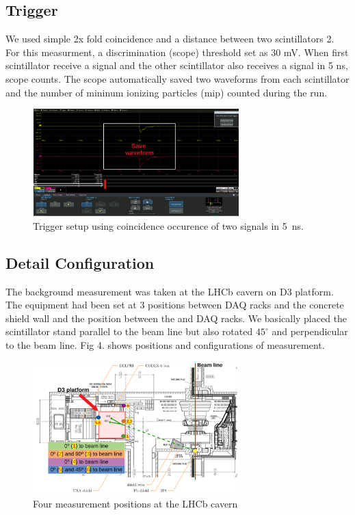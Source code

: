 \subsection{Trigger}
We used simple 2x fold coincidence and a distance between two scintillators 2\cm. 
For this measurment, a discrimination (scope) threshold set as 30 mV.
When first scintillator receive a signal and the other scintillator also receives a signal in 5 ns, scope counts.
The scope automatically saved two waveforms from each scintillator and the number of mininum ionizing particles (mip) counted during the run.

\begin{figure}[h]
\centering
    \includegraphics[width=8cm]{figs/INT/waveform.pdf}
\caption{
    Trigger setup using coincidence occurence of two signals in 5~ns. 
}
\end{figure}

\subsection{Detail Configuration}

The background measurement was taken at the LHCb cavern on D3 platform. The equipment had been set at 3 positions between DAQ racks and the concrete shield wall and the position between the \delphi and DAQ racks.
We basically placed the scintillator stand parallel to the beam line but also rotated $45^{\circ}$ and perpendicular to the beam line.
Fig 4. shows positions and configurations of measurement.

\begin{figure}[h]
\centering
    \includegraphics[width=8cm]{figs/INT/configuration.pdf}
\caption{
    Four measurement positions at the LHCb cavern
}
\end{figure}

